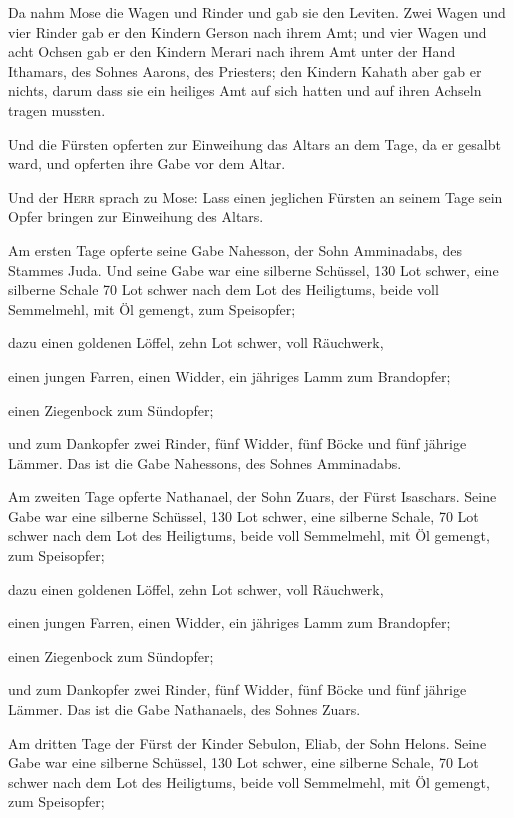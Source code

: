  Da nahm Mose die Wagen und Rinder und gab sie den
Leviten.  Zwei Wagen und vier Rinder gab er den Kindern
Gerson nach ihrem Amt;  und vier Wagen und acht Ochsen gab
er den Kindern Merari nach ihrem Amt unter der Hand Ithamars, des Sohnes
Aarons, des Priesters;  den Kindern Kahath aber gab er
nichts, darum dass sie ein heiliges Amt auf sich hatten und auf ihren
Achseln tragen mussten.

 Und die Fürsten opferten zur Einweihung das Altars an
dem Tage, da er gesalbt ward, und opferten ihre Gabe vor dem Altar.

 Und der \textsc{Herr} sprach zu Mose: Lass einen
jeglichen Fürsten an seinem Tage sein Opfer bringen zur Einweihung des
Altars.

 Am ersten Tage opferte seine Gabe Nahesson, der Sohn
Amminadabs, des Stammes Juda.  Und seine Gabe war eine
silberne Schüssel, 130 Lot schwer, eine silberne Schale 70 Lot schwer
nach dem Lot des Heiligtums, beide voll Semmelmehl, mit Öl gemengt, zum
Speisopfer;

 dazu einen goldenen Löffel, zehn Lot schwer, voll
Räuchwerk,

 einen jungen Farren, einen Widder, ein jähriges Lamm zum
Brandopfer;

 einen Ziegenbock zum Sündopfer;

 und zum Dankopfer zwei Rinder, fünf Widder, fünf Böcke
und fünf jährige Lämmer. Das ist die Gabe Nahessons, des Sohnes
Amminadabs.

 Am zweiten Tage opferte Nathanael, der Sohn Zuars, der
Fürst Isaschars.  Seine Gabe war eine silberne Schüssel,
130 Lot schwer, eine silberne Schale, 70 Lot schwer nach dem Lot des
Heiligtums, beide voll Semmelmehl, mit Öl gemengt, zum Speisopfer;

 dazu einen goldenen Löffel, zehn Lot schwer, voll
Räuchwerk,

 einen jungen Farren, einen Widder, ein jähriges Lamm zum
Brandopfer;

 einen Ziegenbock zum Sündopfer;

 und zum Dankopfer zwei Rinder, fünf Widder, fünf Böcke
und fünf jährige Lämmer. Das ist die Gabe Nathanaels, des Sohnes Zuars.

 Am dritten Tage der Fürst der Kinder Sebulon, Eliab, der
Sohn Helons.  Seine Gabe war eine silberne Schüssel, 130
Lot schwer, eine silberne Schale, 70 Lot schwer nach dem Lot des
Heiligtums, beide voll Semmelmehl, mit Öl gemengt, zum Speisopfer;

